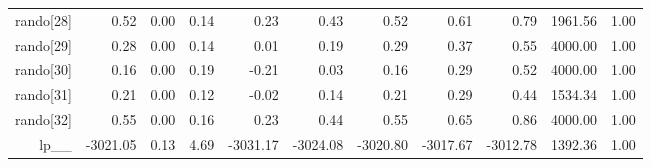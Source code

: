 \begin{table}[ht]
\begin{tabular}{rrrrrrrrrrr}
  rando[28] & 0.52 & 0.00 & 0.14 & 0.23 & 0.43 & 0.52 & 0.61 & 0.79 & 1961.56 & 1.00 \\ 
  rando[29] & 0.28 & 0.00 & 0.14 & 0.01 & 0.19 & 0.29 & 0.37 & 0.55 & 4000.00 & 1.00 \\ 
  rando[30] & 0.16 & 0.00 & 0.19 & -0.21 & 0.03 & 0.16 & 0.29 & 0.52 & 4000.00 & 1.00 \\ 
  rando[31] & 0.21 & 0.00 & 0.12 & -0.02 & 0.14 & 0.21 & 0.29 & 0.44 & 1534.34 & 1.00 \\ 
  rando[32] & 0.55 & 0.00 & 0.16 & 0.23 & 0.44 & 0.55 & 0.65 & 0.86 & 4000.00 & 1.00 \\ 
  lp\_\_ & -3021.05 & 0.13 & 4.69 & -3031.17 & -3024.08 & -3020.80 & -3017.67 & -3012.78 & 1392.36 & 1.00 \\ 
   \hline
\end{tabular}
\label{weifit_tab}
\end{table}
